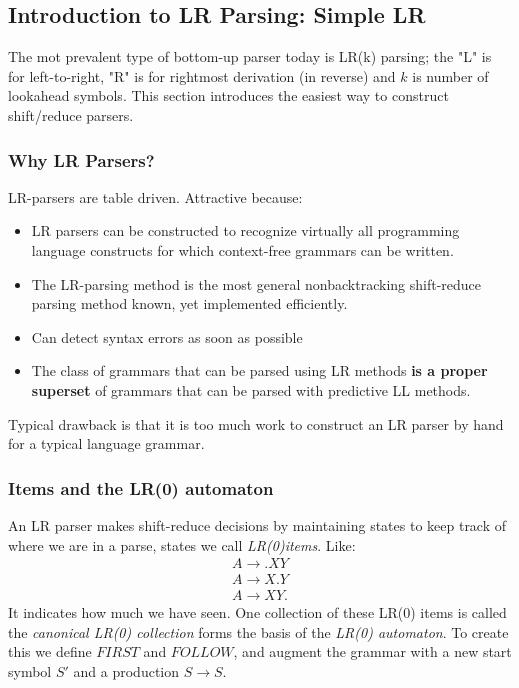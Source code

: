 \documentclass{article}
\begin{document}

\subsection{Introduction to LR Parsing: Simple LR} %
\label{sub:Introduction to LR Parsing: Simple LR}
The mot prevalent type of bottom-up parser today is LR(k) parsing; the "L" is for left-to-right, "R" is for rightmost derivation (in reverse) and $k$ is number of lookahead symbols. This section introduces the easiest way to construct shift/reduce parsers.

\subsubsection{Why LR Parsers?} %
\label{ssub:Why LR Parsers?}
LR-parsers are table driven. Attractive because:
\begin{itemize}
	\item LR parsers can be constructed to recognize virtually all programming language constructs for which context-free grammars can be written.
	\item The LR-parsing method is the most general nonbacktracking shift-reduce parsing method known, yet implemented efficiently.
	\item Can detect syntax errors as soon as possible
	\item The class of grammars that can be parsed using LR methods \textbf{is a proper superset} of grammars that can be parsed with predictive LL methods. 
\end{itemize}
Typical drawback is that it is too much work to construct an LR parser by hand for a typical language grammar.

\subsubsection{Items and the LR(0) automaton} %
\label{ssub:Items and the LR(0) automaton}
An LR parser makes shift-reduce decisions by maintaining states to keep track of where we are in a parse, states we call \emph{LR(0)items}. Like:
\begin{equation}
\begin{split}
	A \to .XY\\
	A \to X.Y\\
	A \to XY.
\end{split}
\end{equation}
It indicates how much we have seen. One collection of these LR(0) items is called the \emph{canonical LR(0) collection} forms the basis of the \emph{LR(0) automaton}. To create this we define $FIRST$ and $FOLLOW$, and augment the grammar with a new start symbol $S'$ and a production $S \to S$.
\end{document}
